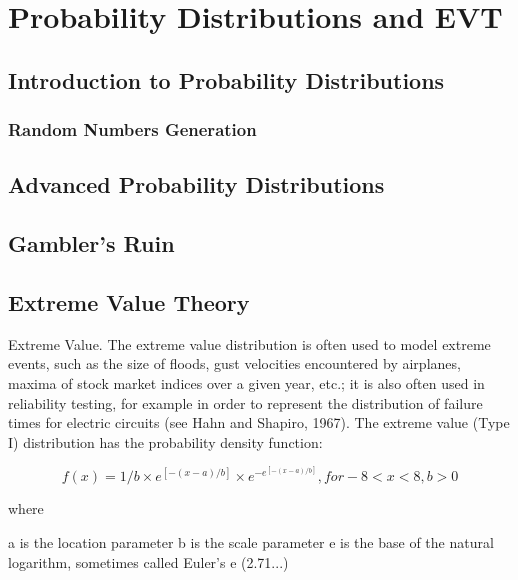 
\section{Probability Distributions and EVT}


\subsection{Introduction to Probability Distributions}

\subsubsection{Random Numbers Generation}

\subsection{Advanced Probability Distributions}

\subsection{Gambler's Ruin}

\subsection{Extreme Value Theory}

Extreme Value. The extreme value distribution is often used to model extreme events, such as the size of floods, gust velocities encountered by airplanes, maxima of stock market indices over a given year, etc.; it is also often used in reliability testing, for example in order to represent the distribution of failure times for electric circuits (see Hahn and Shapiro, 1967). The extreme value (Type I) distribution has the probability density function:

\[f(x) = 1/b \times e^{[-(x-a)/b]} \times e^{-e^{[-(x-a)/b]}},    for -8 < x < 8, b > 0\]

where

a	is the location parameter
b	is the scale parameter
e	is the base of the natural logarithm, sometimes called Euler's e (2.71...)

